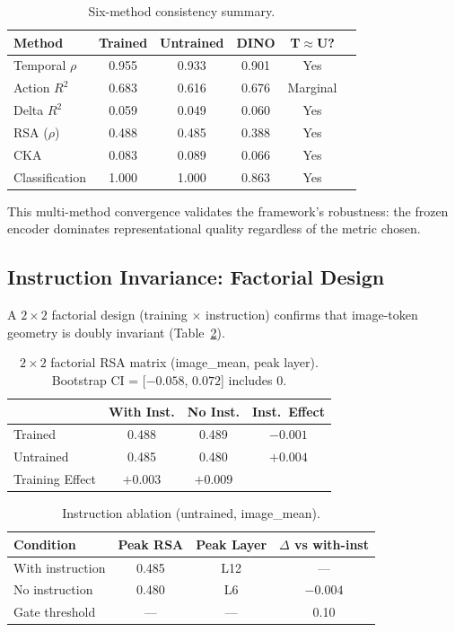 \documentclass[10pt,twocolumn]{article}
\begin{document}
\begin{table}[t]
\centering
\caption{Six-method consistency summary.}
\label{tab:six_method}
\small
\begin{tabular}{lccccl}
\toprule
Method & Trained & Untrained & DINO & T$\approx$U? \\
\midrule
Temporal $\rho$ & 0.955 & 0.933 & 0.901 & Yes \\
Action $R^2$ & 0.683 & 0.616 & 0.676 & Marginal \\
Delta $R^2$ & 0.059 & 0.049 & 0.060 & Yes \\
RSA ($\rho$) & 0.488 & 0.485 & 0.388 & Yes \\
CKA & 0.083 & 0.089 & 0.066 & Yes \\
Classification & 1.000 & 1.000 & 0.863 & Yes \\
\bottomrule
\end{tabular}
\end{table}

This multi-method convergence validates the framework's robustness: the frozen encoder dominates representational quality regardless of the metric chosen.

\subsection{Instruction Invariance: Factorial Design}
\label{sec:invariance}

A $2 \times 2$ factorial design (training $\times$ instruction) confirms that image-token geometry is doubly invariant (Table~\ref{tab:factorial}).

\begin{table}[t]
\centering
\caption{$2 \times 2$ factorial RSA matrix (image\_mean, peak layer). Bootstrap CI = [$-0.058$, $0.072$] includes 0.}
\label{tab:factorial}
\small
\begin{tabular}{lccc}
\toprule
 & With Inst. & No Inst. & Inst.\ Effect \\
\midrule
Trained & 0.488 & 0.489 & $-0.001$ \\
Untrained & 0.485 & 0.480 & $+0.004$ \\
\midrule
Training Effect & $+0.003$ & $+0.009$ & \\
\bottomrule
\end{tabular}
\end{table}

\begin{table}[t]
\centering
\caption{Instruction ablation (untrained, image\_mean).}
\label{tab:inst_ablation}
\small
\begin{tabular}{lccc}
\toprule
Condition & Peak RSA & Peak Layer & $\Delta$ vs with-inst \\
\midrule
With instruction & 0.485 & L12 & --- \\
No instruction & 0.480 & L6 & $-0.004$ \\
Gate threshold & --- & --- & 0.10 \\
\bottomrule
\end{tabular}
\end{table}
\end{document}
